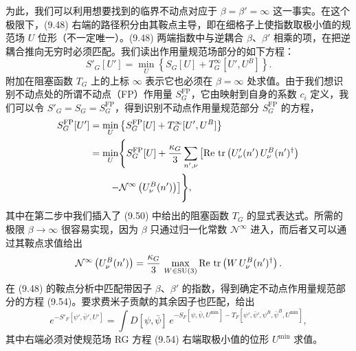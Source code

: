 为此，我们可以利用想要找到的临界不动点对应于 $\beta = \beta' = \infty$ 这一事实。在这个极限下，(9.48) 右端的路径积分由其鞍点主导，即在细格子上使指数取极小值的规范场 $U$ 位形（不一定唯一）。(9.48) 两端指数中与逆耦合 $\beta$、$\beta'$ 相乘的项，在把逆耦合推向无穷时必须匹配。我们读出作用量规范场部分的如下方程：
\begin{equation}
  S'_G[U'] = \min_U\left\{S_G[U] + T^\infty_G[U',U^B]\right\} .
\end{equation}
附加在阻塞函数 $T_G$ 上的上标 $\infty$ 表示它也必须在 $\beta = \infty$ 处求值。由于我们想识别不动点处的所谓不动点（FP）作用量 $S^{\mathrm{FP}}_G$，它由映射到自身的系数 $c_i$ 定义，我们可以令 $S'_G = S_G = S^{\mathrm{FP}}_G$，得到识别不动点作用量规范部分 $S^{\mathrm{FP}}_G$ 的方程，
\begin{align}
  S^{\mathrm{FP}}_G[U']
  &= \min_U\left\{S^{\mathrm{FP}}_G[U] + T^\infty_G[U',U^B]\right\} \nonumber\\
  &= \min_U\Biggl\{S^{\mathrm{FP}}_G[U] + \frac{\kappa_G}{3}\sum_{n',\nu}
     \left[\mathrm{Re}\,\operatorname{tr}\left(U'_\nu(n')\,U^B_\nu(n')^\dagger\right)\right. \nonumber\\
  &\qquad \left.- \mathcal{N}^\infty\left(U^B_\nu(n')\right)\right]\Biggr\} ,
\end{align}
其中在第二步中我们插入了 (9.50) 中给出的阻塞函数 $T_G$ 的显式表达式。所需的极限 $\beta \to \infty$ 很容易实现，因为 $\beta$ 只通过归一化常数 $\mathcal{N}^\infty$ 进入，而后者又可以通过其鞍点求值给出
\begin{equation}
  \mathcal{N}^\infty\left(U^B_\nu(n')\right)
  = \frac{\kappa_G}{3}\,\max_{W\in\mathrm{SU}(3)}
    \mathrm{Re}\,\operatorname{tr}\left(W\,U^B_\nu(n')^\dagger\right) .
\end{equation}
在 (9.48) 的鞍点分析中匹配带因子 $\beta$、$\beta'$ 的指数，得到确定不动点作用量规范部分的方程 (9.54)。要求费米子贡献的其余因子也匹配，给出
\begin{equation}
  e^{-S'_F[\psi',\bar\psi',U']} = \int D[\psi,\bar\psi]\,
    e^{-S_F[\psi,\bar\psi,U^{\min}] - T_F[\psi',\bar\psi',\psi^B,\bar\psi^B,U^{\min}]} ,
\end{equation}
其中右端必须对使规范场 RG 方程 (9.54) 右端取极小值的位形 $U^{\min}$ 求值。

